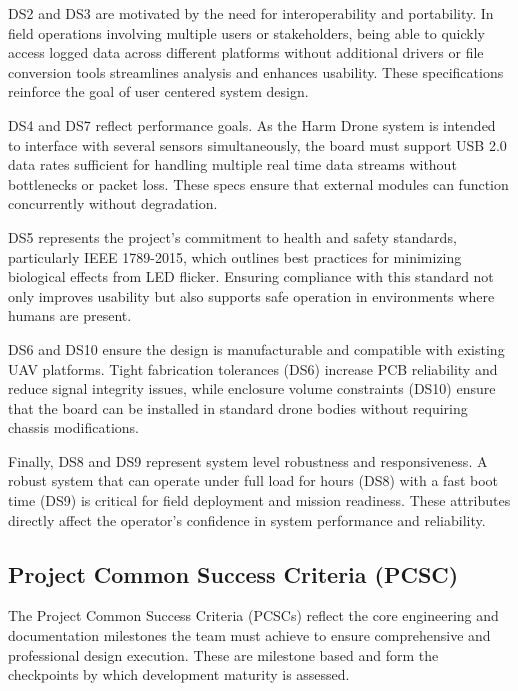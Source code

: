 \documentclass[12pt]{article}
\begin{document}
\par DS2 and DS3 are motivated by the need for interoperability and portability. In field operations involving multiple users or stakeholders, being able to quickly access logged data across different platforms without additional drivers or file conversion tools streamlines analysis and enhances usability. These specifications reinforce the goal of user centered system design.

\par DS4 and DS7 reflect performance goals. As the Harm Drone system is intended to interface with several sensors simultaneously, the board must support USB 2.0 data rates sufficient for handling multiple real time data streams without bottlenecks or packet loss. These specs ensure that external modules can function concurrently without degradation.

\par DS5 represents the project's commitment to health and safety standards, particularly IEEE 1789-2015, which outlines best practices for minimizing biological effects from LED flicker. Ensuring compliance with this standard not only improves usability but also supports safe operation in environments where humans are present.

\par DS6 and DS10 ensure the design is manufacturable and compatible with existing UAV platforms. Tight fabrication tolerances (DS6) increase PCB reliability and reduce signal integrity issues, while enclosure volume constraints (DS10) ensure that the board can be installed in standard drone bodies without requiring chassis modifications.

\par Finally, DS8 and DS9 represent system level robustness and responsiveness. A robust system that can operate under full load for hours (DS8) with a fast boot time (DS9) is critical for field deployment and mission readiness. These attributes directly affect the operator's confidence in system performance and reliability.

\subsection{Project Common Success Criteria (PCSC)}

\par The Project Common Success Criteria (PCSCs) reflect the core engineering and documentation milestones the team must achieve to ensure comprehensive and professional design execution. These are milestone based and form the checkpoints by which development maturity is assessed.
\end{document}
